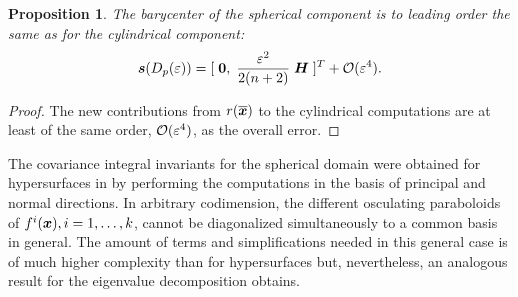 \documentclass[letterpaper, reqno, 11pt]{amsart}
\newtheorem{proposition}[theorem]{Proposition}
\theoremstyle{definition}
\theoremstyle{remark}
\numberwithin{equation}{section}
\begin{document}
\begin{proposition}
	The barycenter of the spherical component is to leading order the same as for the cylindrical component:
\begin{equation}
	\boldsymbol{s}(D_p(\varepsilon)) = [ \;\boldsymbol{0},\; \frac{\varepsilon^2}{2(n+2)}\;\boldsymbol{H}\;]^T +{\mathcal O}(\varepsilon^4).
\end{equation}
\end{proposition}
\begin{proof}
	The new contributions from $r(\boldsymbol{\overline{x}})$ to the cylindrical computations are at least of the same order, ${\mathcal O}(\varepsilon^4)$, as the overall error. 
\end{proof}

The covariance integral invariants for the spherical domain were obtained for hypersurfaces in \cite{alvarez2018a} by performing the computations in the basis of principal and normal directions. In arbitrary codimension, the different osculating paraboloids of $f^i(\boldsymbol{x}), i=1,\dots, k$, cannot be diagonalized simultaneously to a common basis in general. The amount of terms and simplifications needed in this general case is of much higher complexity than for hypersurfaces but, nevertheless, an analogous result for the eigenvalue decomposition obtains.
\end{document}
